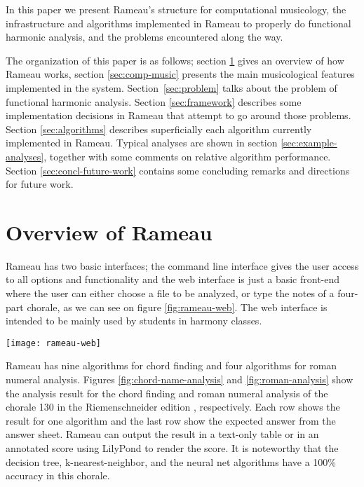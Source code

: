In this paper we present Rameau's structure for computational
musicology, the infrastructure and algorithms implemented in Rameau to
properly do functional harmonic analysis, and the problems encountered
along the way.

The organization of this paper is as follows; section \ref{sec:system}
gives an overview of how Rameau works, section \ref{sec:comp-music}
presents the main musicological features implemented in the
system. Section~\ref{sec:problem} talks about the problem of
functional harmonic analysis. Section \ref{sec:framework} describes
some implementation decisions in Rameau that attempt to go around
those problems.  Section \ref{sec:algorithms} describes superficially
each algorithm currently implemented in Rameau. Typical analyses are
shown in section \ref{sec:example-analyses}, together with some
comments on relative algorithm performance. Section
\ref{sec:concl-future-work} contains some concluding remarks and
directions for future work. 

\section{Overview of Rameau}
\label{sec:system}

Rameau has two basic interfaces; the command line interface gives the
user access to all options and functionality and the web interface is
just a basic front-end where the user can either choose a file to be
analyzed, or type the notes of a four-part chorale, as we can see on
figure \ref{fig:rameau-web}. The web interface is intended to be
mainly used by students in harmony classes.

\begin{figure*}
  \centering
  \texttt{[image: rameau-web]}
  \caption{Rameau's web interface}
  \label{fig:rameau-web}
\end{figure*}

Rameau has nine algorithms for chord finding and four algorithms for
roman numeral analysis. Figures \ref{fig:chord-name-analysis} and
\ref{fig:roman-analysis} show the analysis result for the chord
finding and roman numeral analysis of the chorale 130 in the
Riemenschneider edition \cite{bach41:371} , respectively. Each row
shows the result for one algorithm and the last row show the expected
answer from the answer sheet. Rameau can output the result in a
text-only table or in an annotated score using LilyPond
\cite{nienhuys.ea08:lilypond} to render the score. It is noteworthy
that the decision tree, k-nearest-neighbor, and the neural net
algorithms have a 100\% accuracy in this chorale.

